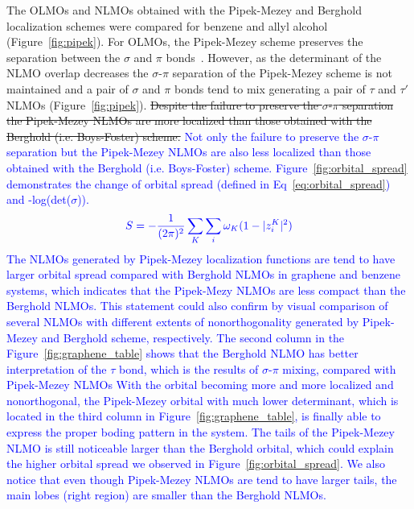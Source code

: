 \documentclass[aps,prl,reprint,amsmath,amssymb]{revtex4-1}
\begin{document}
The OLMOs and NLMOs obtained with the Pipek-Mezey and Berghold localization schemes were compared for benzene and allyl alcohol (Figure~\ref{fig:pipek}). 
For OLMOs, the Pipek-Mezey scheme preserves the separation between the $\sigma$ and $\pi$ bonds~\cite{pipek1989fast}.
However, as the determinant of the NLMO overlap decreases the $\sigma$-$\pi$ separation of the Pipek-Mezey scheme is not maintained and a pair of $\sigma$ and $\pi$ bonds tend to mix generating a pair of $\tau$ and $\tau'$ NLMOs (Figure~\ref{fig:pipek}).  
\st{Despite the failure to preserve the $\sigma$-$\pi$ separation the Pipek-Mezey NLMOs are more localized than those obtained with the Berghold (i.e. Boys-Foster) scheme.}
\textcolor{blue}{Not only the failure to preserve the $\sigma$-$\pi$ separation but the Pipek-Mezey NLMOs are also less localized than those obtained with the Berghold (i.e. Boys-Foster) scheme.}
\textcolor{blue}{Figure~\ref{fig:orbital_spread} demonstrates the change of orbital spread (defined in Eq~\ref{eq:orbital_spread}) and -log(det($\sigma$)).}
%
\begin{equation} \label{eq:orbital_spread}
\begin{split}
\color{blue}{S = - \frac{1}{(2\pi)^2}\sum_K \sum_i \omega_K (1 - \vert z_{i}^{K} \vert^2)}
\end{split}
\end{equation}
%
\textcolor{blue}{The NLMOs generated by Pipek-Mezey localization functions are tend to have larger orbital spread compared with Berghold NLMOs in graphene and benzene systems, which indicates that the Pipek-Mezy NLMOs are less compact than the Berghold NLMOs.}
\textcolor{blue}{This statement could also confirm by visual comparison of several NLMOs with different extents of nonorthogonality generated by Pipek-Mezey and Berghold scheme, respectively.}
\textcolor{blue}{The second column in the Figure~\ref{fig:graphene_table} shows that the Berghold NLMO has better interpretation of the $\tau$ bond, which is the results of $\sigma$-$\pi$ mixing, compared with Pipek-Mezey NLMOs}
\textcolor{blue}{With the orbital becoming more and more localized and nonorthogonal, the Pipek-Mezey orbital with much lower determinant, which is located in the third column in Figure~\ref{fig:graphene_table}, is finally able to express the proper boding pattern in the system.}
\textcolor{blue}{The tails of the Pipek-Mezey NLMO is still noticeable larger than the Berghold orbital, which could explain the higher orbital spread we observed in Figure~\ref{fig:orbital_spread}.}
\textcolor{blue}{We also notice that even though Pipek-Mezey NLMOs are tend to have larger tails, the main lobes (right region) are smaller than the Berghold NLMOs.}
\end{document}
